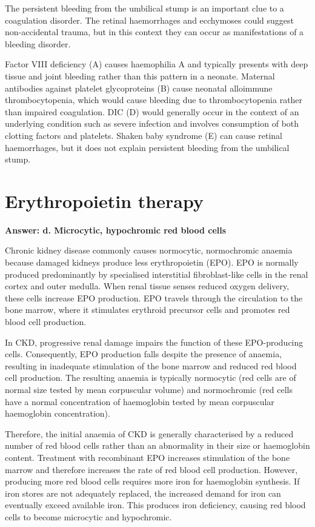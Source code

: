 \documentclass{article}
\begin{document}
The persistent bleeding from the umbilical stump is an important clue to a coagulation disorder. The retinal haemorrhages and ecchymoses could suggest non-accidental trauma, but in this context they can occur as manifestations of a bleeding disorder. 

Factor VIII deficiency (A) causes haemophilia A and typically presents with deep tissue and joint bleeding rather than this pattern in a neonate. Maternal antibodies against platelet glycoproteins (B) cause neonatal alloimmune thrombocytopenia, which would cause bleeding due to thrombocytopenia rather than impaired coagulation. DIC (D) would generally occur in the context of an underlying condition such as severe infection and involves consumption of both clotting factors and platelets. Shaken baby syndrome (E) can cause retinal haemorrhages, but it does not explain persistent bleeding from the umbilical stump.

\section{Erythropoietin therapy}

\textbf{Answer: d. Microcytic, hypochromic red blood cells}

Chronic kidney disease commonly causes normocytic, normochromic anaemia because damaged kidneys produce less erythropoietin (EPO). EPO is normally produced predominantly by specialised interstitial fibroblast-like cells in the renal cortex and outer medulla. When renal tissue senses reduced oxygen delivery, these cells increase EPO production. EPO travels through the circulation to the bone marrow, where it stimulates erythroid precursor cells and promotes red blood cell production.

In CKD, progressive renal damage impairs the function of these EPO-producing cells. Consequently, EPO production falls despite the presence of anaemia, resulting in inadequate stimulation of the bone marrow and reduced red blood cell production. The resulting anaemia is typically normocytic (red cells are of normal size tested by mean corpuscular volume) and normochromic (red cells have a normal concentration of haemoglobin tested by mean corpuscular haemoglobin concentration). 

Therefore, the initial anaemia of CKD is generally characterised by a reduced number of red blood cells rather than an abnormality in their size or haemoglobin content. Treatment with recombinant EPO increases stimulation of the bone marrow and therefore increases the rate of red blood cell production. However, producing more red blood cells requires more iron for haemoglobin synthesis. If iron stores are not adequately replaced, the increased demand for iron can eventually exceed available iron. This produces iron deficiency, causing red blood cells to become microcytic and hypochromic. 
\end{document}
